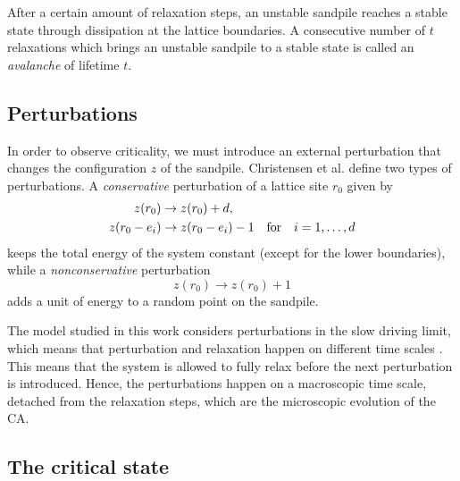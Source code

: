 After a certain amount of relaxation steps, an unstable sandpile reaches a stable state through dissipation at the lattice boundaries. A consecutive number of $t$ relaxations which brings an unstable sandpile to a stable state is called an \emph{avalanche} of lifetime $t$.

\subsection{Perturbations}

In order to observe criticality, we must introduce an external perturbation that changes the configuration $z$ of the sandpile. Christensen et al. \cite{christensen1991dynamical} define two types of perturbations. A \emph{conservative} perturbation of a lattice site $r_0$ given by
\begin{align}
    z(r_0) &\to z(r_0) + d, \label{eqn:con_perturb} \\
    z(r_0-e_i) &\to z(r_0-e_i) - 1 \qq{for} i=1,\ldots,d
\end{align}
keeps the total energy of the system constant (except for the lower boundaries), while a \emph{nonconservative} perturbation
\begin{equation}
    z(r_0) \to z(r_0) + 1 \label{eqn:noncon_perturb}
\end{equation}
adds a unit of energy to a random point on the sandpile.

The model studied in this work considers perturbations in the slow driving limit, which means that perturbation and relaxation happen on different time scales \cite{barrat1999fluctuations}. This means that the system is allowed to fully relax before the next perturbation is introduced. Hence, the perturbations happen on a macroscopic time scale, detached from the relaxation steps, which are the microscopic evolution of the CA.

\subsection{The critical state} \label{sec:critical-state}

